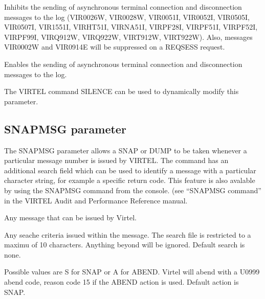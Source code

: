 \documentclass[letterpaper,10pt,english]{sphinxmanual}
\begin{document}
\sphinxAtStartPar
{} \sphinxhyphen{} Inhibits the sending of asynchronous terminal connection and disconnection messages to the log (VIR0026W, VIR0028W, VIR0051I, VIR0052I, VIR0505I, VIR0507I, VIR1551I, VIRHT51I, VIRNA51I, VIRPF28I, VIRPF51I, VIRPF52I, VIRPF99I, VIRQ912W, VIRQ922W, VIRT912W, VIRT922W). Also, messages VIR0002W and VIR0914E will be suppressed on a REQSESS request.

\sphinxAtStartPar
{} \sphinxhyphen{} Enables the sending of asynchronous terminal connection and disconnection messages to the log.

\sphinxAtStartPar
The VIRTEL command SILENCE can be used to dynamically modify this parameter.

\ignorespaces 

\subsection{SNAPMSG parameter}
\label{\detokenize{Installation_Guide:snapmsg-parameter}}\label{\detokenize{Installation_Guide:index-115}}
\begin{sphinxVerbatim}[commandchars=\\\{\}]
\end{sphinxVerbatim}

\sphinxAtStartPar
The SNAPMSG parameter allows a SNAP or DUMP to be taken whenever a particular message number is issued by VIRTEL. The command has an additional search field which can be used to identify a message with a particular character string, for example a specific return code. This feature is also avalable by using the SNAPMSG command from the console. (see “SNAPMSG command” in the VIRTEL Audit and Performance Reference manual.
\begin{description}
\sphinxAtStartPar
Any message that can be issued by Virtel.

\sphinxAtStartPar
Any seache criteria issued within the message. The search file is restricted to a maximu of 10 characters. Anything beyond will be ignored. Default search is none.

\sphinxAtStartPar
Possible values are S for SNAP or A for ABEND. Virtel will abend with a U0999 abend code, reason code 15 if the ABEND action is used. Default action is SNAP.

\end{description}
\end{document}
